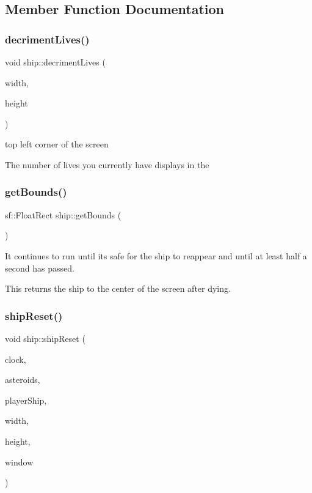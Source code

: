 \subsection{Member Function Documentation}
\mbox{\label{classship_ad46173638c8514f81e5b100cfa4186a8}} 
\subsubsection{\texorpdfstring{decriment\+Lives()}{decrimentLives()}}
{\footnotesize\ttfamily void ship\+::decriment\+Lives (\begin{DoxyParamCaption}\item[{int}]{width,  }\item[{int}]{height }\end{DoxyParamCaption})}



top left corner of the screen 

The number of lives you currently have displays in the \mbox{\label{classship_a12077a1e21b72f91054940da28fb5c90}} 
\subsubsection{\texorpdfstring{get\+Bounds()}{getBounds()}}
{\footnotesize\ttfamily sf\+::\+Float\+Rect ship\+::get\+Bounds (\begin{DoxyParamCaption}{ }\end{DoxyParamCaption})}



It continues to run until it\textquotesingle{}s safe for the ship to reappear and until at least half a second has passed. 

This returns the ship to the center of the screen after dying. \mbox{\label{classship_a3e7fa6b462de7ea41bd3dd2c96d2de56}} 
\subsubsection{\texorpdfstring{ship\+Reset()}{shipReset()}}
{\footnotesize\ttfamily void ship\+::ship\+Reset (\begin{DoxyParamCaption}\item[{sf\+::\+Clock \&}]{clock,  }\item[{std\+::vector$<$ \hyperlink{classasteroid}{asteroid} $>$ \&}]{asteroids,  }\item[{\hyperlink{classship}{ship} \&}]{player\+Ship,  }\item[{int}]{width,  }\item[{int}]{height,  }\item[{sf\+::\+Render\+Window \&}]{window }\end{DoxyParamCaption})\hspace{0.3cm}{\ttfamily [static]}}



